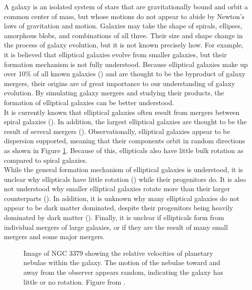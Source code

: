 \documentclass[twocolumn]{aastex63}
\begin{document}
A galaxy is an isolated system of stars that are gravitationally bound and orbit a common center of mass, but whose motions do not appear to abide by Newton's laws of gravitation and motion. Galaxies may take the shape of spirals, ellipses, amorphous blobs, and combinations of all three. Their size and shape change in the process of galaxy evolution, but it is not known precisely how. For example, it is believed that elliptical galaxies evolve from smaller galaxies, but their formation mechanism is not fully understood. Because elliptical galaxies make up over 10\% of all known galaxies (\cite{1996MNRAS.278.1025L}) and are thought to be the byproduct of galaxy mergers, their origins are of great importance to our understanding of galaxy evolution. By simulating galaxy mergers and studying their products, the formation of elliptical galaxies can be better understood.\\

It is currently known that elliptical galaxies often result from mergers between spiral galaxies (\cite{2006ApJ...650..791C}). In addition, the largest elliptical galaxies are thought to be the result of several mergers (\cite{2006ApJ...650..791C}). Observationally, elliptical galaxies appear to be dispersion supported, meaning that their components orbit in random directions as shown in Figure \ref{dispersion}. Because of this, ellipticals also have little bulk rotation as compared to spiral galaxies.\\

While the general formation mechanism of elliptical galaxies is understood, it is unclear why ellipticals have little rotation (\cite{1998A&AS..133..325G}) while their progenitors do. It is also not understood why smaller elliptical galaxies rotate more than their larger counterparts (\cite{2011MNRAS.414..888E}). In addition, it is unknown why many elliptical galaxies do not appear to be dark matter dominated, despite their progenitors being heavily dominated by dark matter (\cite{2003Sci...301.1696R}). Finally, it is unclear if ellipticals form from individual mergers of large galaxies, or if they are the result of many small mergers and some major mergers.

\begin{figure}
    \centering
    \caption{Image of NGC 3379 showing the relative velocities of planetary nebulae within the galaxy. The motion of the nebulae toward and away from the observer appears random, indicating the galaxy has little or no rotation. Figure from \cite{2003Sci...301.1696R}.}
    \label{dispersion}
\end{figure}
\end{document}
